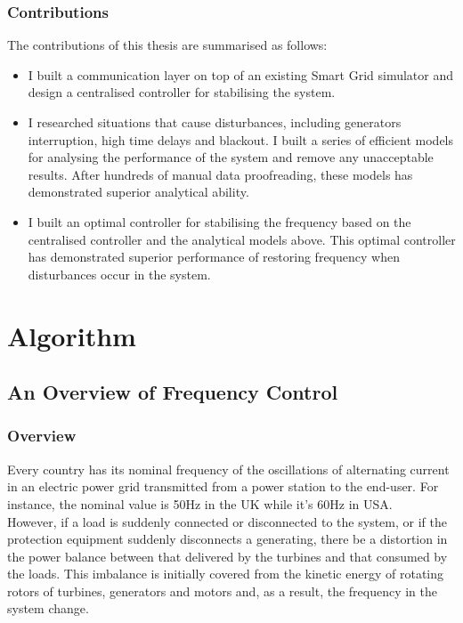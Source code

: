 \documentclass{report}
\begin{document}
\section{Contributions} %
The contributions of this thesis are summarised as follows:\\
\begin{itemize}
  \item I built a communication layer on top of an existing Smart Grid simulator and design a centralised controller for stabilising the system.\\
  
  \item I researched situations that cause disturbances, including generators interruption, high time delays and blackout. I built a series of efficient models for analysing the performance of the system and remove any unacceptable results. After hundreds of manual data proofreading, these models has demonstrated superior analytical ability.\\
  
  \item I built an optimal controller for stabilising the frequency based on the centralised controller and the analytical models above. This optimal controller has demonstrated superior performance of restoring frequency when disturbances occur in the system.\\
\end{itemize}


\part{Algorithm}
\chapter{An Overview of Frequency Control}
\label{Chapter2}
\section{Overview} %
Every country has its nominal frequency of the oscillations of alternating current in an electric power grid transmitted from a power station to the end-user. For instance, the nominal value is 50Hz in the UK while it’s 60Hz in USA.\\

However, if a load is suddenly connected or disconnected to the system, or if the protection equipment suddenly disconnects a generating, there be a distortion in the power balance between that delivered by the turbines and that consumed by the loads. This imbalance is initially covered from the kinetic energy of rotating rotors of turbines, generators and motors and, as a result, the frequency in the system change. \\
\end{document}
